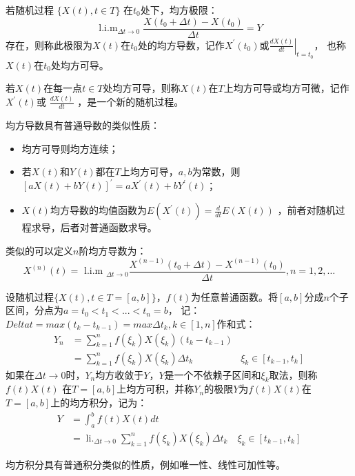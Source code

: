 \begin{definition}
  若随机过程 $\{ X(t), t \in T \}$ 在$t_0$处下，均方极限：
  \begin{equation}
    \operatorname{l.i.m}_{\Delta t\to0}\frac{X(t_0+\Delta t)-X(t_0)}{\Delta t}=Y
    \end{equation}
  存在，则称此极限为$X(t)$在$t_0$处的均方导数，记作$X^{\prime}(t_0)$或$\left.\frac{d X(t)}{d t}\right|_{t=t_0}$，
  也称$X(t)$在$t_0$处均方可导。

  若$X(t)$在每一点$t \in T$处均方可导，则称$X(t)$在$T$上均方可导或均方可微，记作$X^{\prime}(t)$或
  $\frac{d X(t)}{d t}$ ，是一个新的随机过程。
\end{definition}

均方导数具有普通导数的类似性质：

\begin{property}
  \begin{itemize}
    \item[1.]  均方可导则均方连续；
    \item[2.]  若$X(t)$和$Y(t)$都在$T$上均方可导，$a, b$为常数，则$[a X(t)+b Y(t)]^{\prime}=a X^{\prime}(t)+b Y^{\prime}(t)$；
    \item[3.]  $X(t)$均方导数的均值函数为$E(X^{\prime}(t))=\frac{d}{dt}E(X(t))$ ，前者对随机过程求导，后者对普通函数求导。
  \end{itemize}
\end{property}
类似的可以定义$n$阶均方导数为：
\begin{equation}
  X^{(n)}(t)=\text { l.i.m }_{\Delta t \rightarrow 0} \frac{X^{(n-1)}\left(t_0+\Delta t\right)-X^{(n-1)}\left(t_0\right)}{\Delta t}, n=1,2, \ldots
  \end{equation}

\begin{definition}
  设随机过程$\{X(t), t \in T =[a, b] \}$，$f(t)$为任意普通函数。将$[a, b]$分成$n$个子区间，分点为$a=t_0 < t_1 < ... < t_n = b$，
  记：
  $Delta t = max(t_k - t_{k-1}) = max \Delta t_k, k \in [1, n]$作和式：
  \begin{equation}
    \begin{array}{rlr}
    Y_n & =\sum_{k=1}^n f\left(\xi_k\right) X\left(\xi_k\right)\left(t_k-t_{k-1}\right) & \\
    & =\sum_{k=1}^n f\left(\xi_k\right) X\left(\xi_k\right) \Delta t_k & \xi_k \in\left[t_{k-1}, t_k\right]
    \end{array}
  \end{equation}
如果在$\Delta t \rightarrow 0$时，$Y_n$均方收敛于$Y$，$Y$是一个不依赖子区间和$\xi_k$取法，则称$f(t)X(t)$
在$T=[a, b]$上均方可积，并称$Y_n$的极限$Y$为$f(t)X(t)$在$T=[a, b]$上的均方积分，记为：
\begin{equation}
  \begin{aligned}
  Y & =\int_a^b f(t) X(t) d t \\
  & =\operatorname{li.}_{\Delta t \rightarrow 0} \sum_{k=1}^n f\left(\xi_k\right) X\left(\xi_k\right) \Delta t_k \quad \xi_k \in\left[t_{k-1}, t_k\right]
  \end{aligned}
  \end{equation}
\end{definition}
均方积分具有普通积分类似的性质，例如唯一性、线性可加性等。

